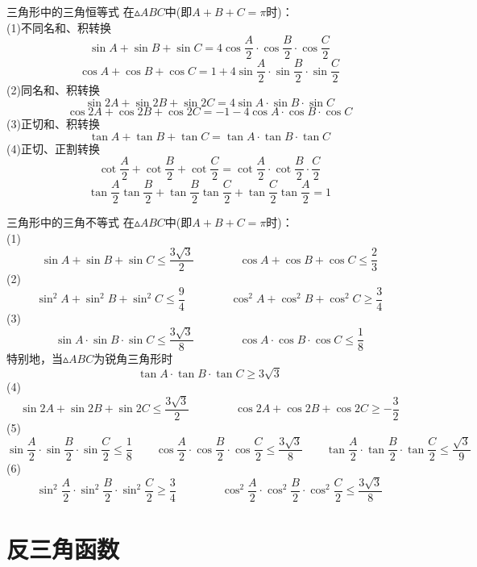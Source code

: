 \documentclass[lang=cn, zihao=5]{elegantbook}
\begin{document}
\begin{proposition}{三角形中的三角恒等式} %
    在$\vartriangle ABC$中(即$A+B+C=\pi$时)：\\
    (1)不同名和、积转换
    $$\sin A + \sin B + \sin C = 4 \cos \frac{A}{2} \cdot \cos \frac{B}{2} \cdot \cos \frac{C}{2}$$
    $$\cos A + \cos B + \cos C = 1 + 4 \sin \frac{A}{2} \cdot \sin \frac{B}{2} \cdot \sin \frac{C}{2}$$
    (2)同名和、积转换
    $$\sin 2A + \sin 2B + \sin 2C = 4\sin A \cdot \sin B \cdot \sin C$$
    $$\cos 2A + \cos 2B + \cos 2C = -1 - 4\cos A \cdot \cos B \cdot \cos C$$
    (3)正切和、积转换
    $$\tan A + \tan B + \tan C = \tan A \cdot \tan B \cdot \tan C$$
    (4)正切、正割转换
    $$\cot \frac{A}{2} + \cot \frac{B}{2} + \cot \frac{C}{2} = \cot \frac{A}{2} \cdot \cot \frac{B}{2} \cdot \frac{C}{2}$$
    $$\tan \frac{A}{2} \tan \frac{B}{2} + \tan \frac{B}{2} \tan \frac{C}{2} + \tan \frac{C}{2} \tan \frac{A}{2} = 1$$
\end{proposition}

\begin{proposition}{三角形中的三角不等式} %
    在$\vartriangle ABC$中(即$A+B+C=\pi$时)：\\
    (1)$$\sin A + \sin B + \sin C \leq \frac{ 3\sqrt{3} }{2} \qquad \qquad \cos A + \cos B + \cos C \leq \frac{2}{3}$$
    (2)$$\sin ^2 A + \sin ^2 B + \sin ^2 C \leq \frac{9}{4} \qquad \qquad \cos ^2 A + \cos ^2 B + \cos ^2 C \geq \frac{3}{4}$$
    (3)$$\sin A \cdot \sin B \cdot \sin C \leq \frac{ 3\sqrt{3} }{8} \qquad \qquad \cos A \cdot \cos B \cdot \cos C \leq \frac{1}{8}$$
    特别地，当$\vartriangle ABC$为锐角三角形时
    $$\tan A \cdot \tan B \cdot \tan C \geq 3\sqrt{3}$$
    (4)
    $$\sin 2A + \sin 2B + \sin 2C \leq \frac{ 3\sqrt{3} }{2} \qquad \qquad \cos 2A + \cos 2B + \cos 2C \geq -\frac{3}{2}$$
    (5)
    $$\sin \frac{A}{2} \cdot \sin \frac{B}{2} \cdot \sin \frac{C}{2} \leq \frac{1}{8} \qquad \cos \frac{A}{2} \cdot \cos \frac{B}{2} \cdot \cos \frac{C}{2} \leq \frac{3 \sqrt{3}}{8} \qquad \tan \frac{A}{2} \cdot \tan \frac{B}{2} \cdot \tan \frac{C}{2} \leq \frac{\sqrt{3}}{9}$$
    (6)$$\sin ^2 \frac{A}{2} \cdot \sin ^2 \frac{B}{2} \cdot \sin ^2 \frac{C}{2} \geq \frac{3}{4} \qquad \qquad \cos ^2 \frac{A}{2} \cdot \cos ^2 \frac{B}{2} \cdot \cos ^2 \frac{C}{2} \leq \frac{3 \sqrt{3}}{8}$$
\end{proposition}

\section{反三角函数}
\end{document}

